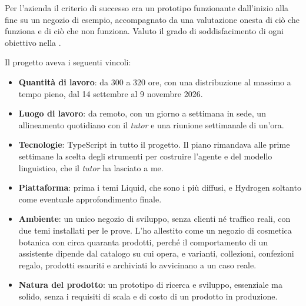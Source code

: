 Per l’azienda il criterio di successo era un prototipo funzionante dall’inizio alla fine su un
negozio di esempio, accompagnato da una valutazione onesta di ciò che funziona e di ciò che non
funziona. Valuto il grado di soddisfacimento di ogni obiettivo nella .

Il progetto aveva i seguenti vincoli:

\begin{itemize}
	\item \textbf{Quantità di lavoro}: da 300 a 320 ore, con una distribuzione al massimo a tempo
	pieno, dal 14 settembre al 9 novembre 2026.
	\item \textbf{Luogo di lavoro}: da remoto, con un giorno a settimana in sede, un allineamento
	quotidiano con il \emph{tutor} e una riunione settimanale di un’ora.
	\item \textbf{Tecnologie}: TypeScript in tutto il progetto. Il piano rimandava alle prime settimane la scelta degli strumenti
	per costruire l’agente e del modello linguistico, che il \emph{tutor} ha lasciato a me.
	\item \textbf{Piattaforma}: prima i temi Liquid, che sono i più diffusi, e Hydrogen soltanto come
	eventuale approfondimento finale.
	\item \textbf{Ambiente}: un unico negozio di sviluppo, senza clienti né traffico reali, con due
	temi installati per le prove. L’ho allestito come un negozio di cosmetica botanica con circa
	quaranta prodotti, perché il comportamento di un assistente dipende dal catalogo su cui opera, e
	varianti, collezioni, confezioni regalo, prodotti esauriti e archiviati lo avvicinano a un caso
	reale.
	\item \textbf{Natura del prodotto}: un prototipo di ricerca e sviluppo, essenziale ma solido,
	senza i requisiti di scala e di costo di un prodotto in produzione.
\end{itemize}
